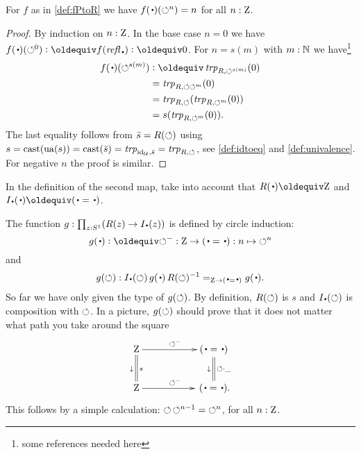 \begin{lemma}\label{lem:windingnumber}
For $f$ as in \cref{def:fPtoR} we have $f(\base)(\Sloop^n)=n$ for all $n:\mathrm{Z}$.
\end{lemma}
\begin{proof}
By induction on $n:\mathrm{Z}$.  In the base case $n=0$ we have
$f(\base)(\Sloop^0)\defeq f(\refl\base)\defeq 0$.
For $n=s(m)$ with $m:\mathbb{N}$ we have\footnote{some references needed here} 
\begin{align*}
  f(\base)(\Sloop^{s(m)})&\defeq\trp{R,\Sloop^{s(m)}}(0)\\
  &=\trp{R,\Sloop \Sloop^{m}}(0)\\
  &=\trp{R,\Sloop}(\trp{R,\Sloop^m}(0))\\
  &=s(\trp{R,\Sloop^m}(0)).
\end{align*}
The last equality follows from $\bar {s}=R(\circlearrowleft)$ using
$s=\mathrm{cast}(\mathrm{ua}(s))=\mathrm{cast}(\bar {s})=\mathop{\mathit{trp}_{\mathord{\mathrm{id}}_{\mathcal{U}},\bar {s}}}=\mathop{\mathit{trp}_{R,\circlearrowleft}}$, 
see \cref{def:idtoeq} and \cref{def:univalence}.
For negative $n$ the proof is similar.
\end{proof}

In the definition of the second map, 
take into account that $R(\base)\jdeq \zet$ and $\uc{\base}(\base) \jdeq (\base=\base)$.

\begin{definition}\label{def:gRtoP}
The function $g:\prod_{z:\Sc}(R(z)\to \uc{\base}(z))$ is 
defined by circle induction: 
\[
g(\base)\defeq {\Sloop^{-}}:\zet\to(\base=\base) : n \mapsto {\Sloop^n}
\]
and 
\[
g(\Sloop): \uc{\base}(\Sloop)\, g(\base)\,R(\Sloop)^{-1}=_{\zet\to (\base=\base)} g(\base).
\]
So far we have only given the type of $g(\circlearrowleft)$. By definition, $R(\circlearrowleft)$ is $s$
and $\uc{\base}(\Sloop)$ is composition with $\circlearrowleft$.
In a picture, $g(\circlearrowleft)$ should prove that it does not matter what 
path you take around the square
$$\xymatrix{\zet\ar[rr]^{\Sloop^-}\ar@{=}[d]^s_\downarrow
 &&(\base=\base)\ar@{=}[d]^{\Sloop\cdot\_}_\downarrow\\
  \zet\ar[rr]^{\Sloop^-}&&\,(\base=\base).}
$$
This follows by a simple calculation: ${\circlearrowleft\,\circlearrowleft^{n-1}} = {\circlearrowleft^n}$, 
for all $n:\mathrm{Z}$. 
\end{definition}


